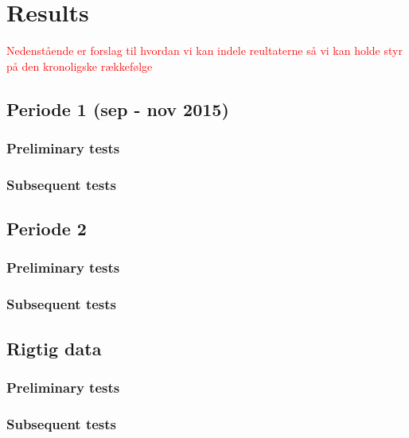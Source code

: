 \section{Results}
\textcolor{red}{Nedenstående er forslag til hvordan vi kan indele reultaterne så vi kan holde styr på den kronoligske rækkefølge} 

\subsection{Periode 1 (sep - nov 2015)}
\subsubsection{Preliminary tests}
\subsubsection{Subsequent tests}
\subsection{Periode 2}
\subsubsection{Preliminary tests}
\subsubsection{Subsequent tests}
\subsection{Rigtig data}
\subsubsection{Preliminary tests}
\subsubsection{Subsequent tests}
